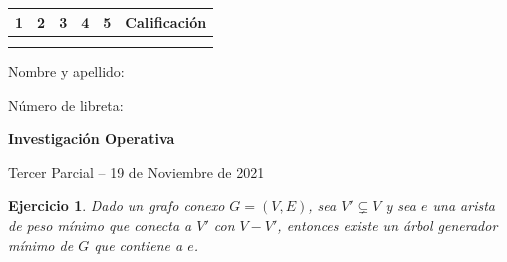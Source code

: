 \documentclass[a4paper,oneside,12pt]{amsart}
\newcommand{\nombremateria}
{Investigaci\'on Operativa}
\newcommand{\numeroparcial}
    { Tercer Parcial }
\newcommand{\fecha}
    {19 de Noviembre de 2021}
\newtheorem{quest}{Ejercicio}
\begin{document}
\hfill \hfill
\begin{tabular}[c]{|c|c|c|c|c|c|}
\hline 
1 & 2 & 3 & 4 & 5 & Calificaci\'on \\ \hline \hline
\hspace{1.2 cm} & \hspace{1.2 cm} & \hspace{1.2 cm} & \hspace{1.2 cm} & \hspace{1.2 cm} &\hspace{1.5 cm} \\
\hspace{1.2 cm} & \hspace{1.2 cm} & \hspace{1.2 cm} & \hspace{1.2 cm} & \hspace{1.2 cm} &\hspace{1.5 cm} \\ \hline

\end{tabular}

\vspace{-1cm}

\noindent Nombre y apellido:

\vspace{0.2cm}

\noindent Número de libreta:

\noindent \hrulefill 

\smallskip
\renewcommand{\baselinestretch}{1.1}

\begin{center}
	\large \textbf{\nombremateria} 
	
	\numeroparcial -- \fecha
\end{center}

\vspace{.6cm}
\renewcommand{\theenumi}{\textbf{\arabic{enumi}}}


\begin{quest} 
    Dado un grafo conexo $G=(V,E)$, sea $V'\subsetneq V$ y sea $e$ una arista de peso mínimo que conecta a $V'$ con $V-V'$, entonces existe un árbol generador mínimo de $G$ que contiene a $e$. 

\end{quest}


\end{document}
